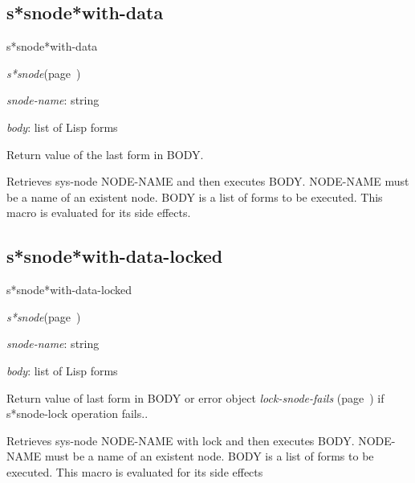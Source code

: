 \subsection{s*snode*with-data}
\label{s*snode*with-data}

\begin{description}
\item [Name:]  s*snode*with-data

\item [Class:]
{\sl s*snode}\hfill(page~\pageref{s*snode})

\item [Parameters:]
\item {\sl snode-name}:  string

\item {\sl body}:  list of Lisp forms


\item [Return-value:] 
Return value of the last form in BODY.

\item [Description:]
Retrieves sys-node NODE-NAME and then executes BODY.
NODE-NAME must be a name of an existent node. 
BODY is a list of forms to be executed.  This macro is
evaluated for its side effects.

\item [Public:]




\end{description}
\horizontalline

\subsection{s*snode*with-data-locked}
\label{s*snode*with-data-locked}

\begin{description}
\item [Name:]  s*snode*with-data-locked

\item [Class:]
{\sl s*snode}\hfill(page~\pageref{s*snode})

\item [Parameters:]
\item {\sl snode-name}:  string

\item {\sl body}:  list of Lisp forms


\item [Return-value:]
Return value of last form in BODY or error object
{\sl lock-snode-fails} (page~\pageref{lock-snode-fails}) if s*snode-lock operation fails..

\item [Description:]
Retrieves sys-node NODE-NAME with lock and then
executes BODY.  NODE-NAME must be a name of an
existent node.  BODY is a list of forms to be
executed.  This macro is evaluated for its side
effects

\item [Public:]



\end{description}
\horizontalline

